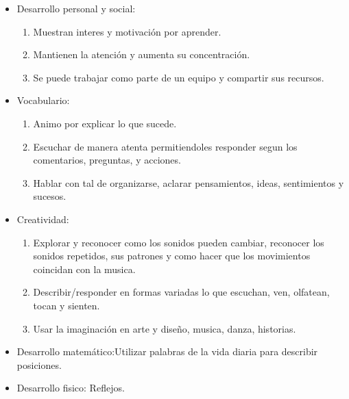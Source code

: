 \documentclass{bmcart}
\begin{document}
\begin{itemize}
	\item Desarrollo personal y social:
	\begin{enumerate}
		\item Muestran interes y motivación por aprender.
		\item Mantienen la atención y aumenta su concentración.
		\item Se puede trabajar como parte de un equipo y compartir sus recursos.
	\end{enumerate}
	\item Vocabulario:
	\begin{enumerate}
		\item Animo por explicar lo que sucede.
		\item Escuchar de manera atenta permitiendoles responder segun los comentarios, preguntas, y acciones.
		\item Hablar con tal de organizarse, aclarar pensamientos, ideas, sentimientos y sucesos.
	\end{enumerate}
	\item Creatividad:
	\begin{enumerate}
		\item Explorar y reconocer como los sonidos pueden cambiar, reconocer los sonidos repetidos, sus patrones y como hacer que los movimientos coincidan con la musica.
		\item Describir/responder en formas variadas lo que escuchan, ven, olfatean, tocan y sienten.
		\item Usar la imaginación en arte y diseño, musica, danza, historias.
	\end{enumerate}
	\item Desarrollo matemático:Utilizar palabras de la vida diaria para describir posiciones.
	\item Desarrollo fisico: Reflejos.
\end{itemize}
\end{document}
